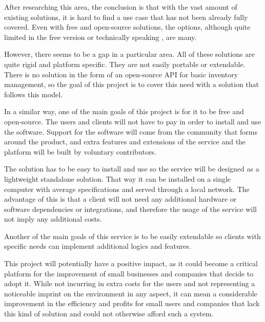 After researching this area, the conclusion is that with the vast amount of existing solutions, it is hard to find a use case that has not been already fully covered. Even with free and open-source solutions, the options, although quite limited in the free version \cite{6,7} or technically speaking \cite{8}, are many.

However, there seems to be a gap in a particular area. All of these solutions are quite rigid and platform specific. They are not easily portable or extendable. There is no solution in the form of an open-source API for basic inventory management, so the goal of this project is to cover this need with a solution that follows this model.

In a similar way, one of the main goals of this project is for it to be free and open-source. The users and clients will not have to pay in order to install and use the software. Support for the software will come from the community that forms around the product, and extra features and extensions of the service and the platform will be built by voluntary contributors.

The solution has to be easy to install and use so the service will be designed as a lightweight standalone solution. That way it can be installed on a single computer with average specifications and served through a local network. The advantage of this is that a client will not need any additional hardware or software dependencies or integrations, and therefore the usage of the service will not imply any additional costs.

Another of the main goals of this service is to be easily extendable so clients with specific needs can implement additional logics and features.

This project will potentially have a positive impact, as it could become a critical platform for the improvement of small businesses and companies that decide to adopt it. While not incurring in extra costs for the users and not representing a noticeable imprint on the environment in any aspect, it can mean a considerable improvement in the efficiency and profits for small users and companies that lack this kind of solution and could not otherwise afford such a system.